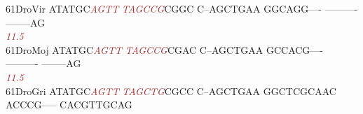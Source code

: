 \documentclass[11pt,twoside,reqno,a4paper]{article}
\begin{document}
{61\hspace*{2\charwidth}DroVir	ATATGC\textit{\textcolor{brown}{A}}\textit{\textcolor{brown}{G}}\textit{\textcolor{brown}{T}}\textit{\textcolor{brown}{T}}	\textit{\textcolor{brown}{T}}\textit{\textcolor{brown}{A}}\textit{\textcolor{brown}{G}}\textit{\textcolor{brown}{C}}\textit{\textcolor{brown}{C}}\textit{\textcolor{brown}{G}}CGGC	C--AGCTGAA	GGCAGG----	----------	--------AG	\\
\hspace*{4\charwidth}\hspace*{7\charwidth}\hspace*{6\charwidth}\textit{\textcolor{brown}{11.5}}\hspace*{1\charwidth}\hspace*{1\charwidth}\hspace*{1\charwidth}\hspace*{1\charwidth}\hspace*{1\charwidth}\hspace*{1\charwidth}\\
61\hspace*{2\charwidth}DroMoj	ATATGC\textit{\textcolor{brown}{A}}\textit{\textcolor{brown}{G}}\textit{\textcolor{brown}{T}}\textit{\textcolor{brown}{T}}	\textit{\textcolor{brown}{T}}\textit{\textcolor{brown}{A}}\textit{\textcolor{brown}{G}}\textit{\textcolor{brown}{C}}\textit{\textcolor{brown}{C}}\textit{\textcolor{brown}{G}}CGAC	C--AGCTGAA	GCCACG----	----------	--------AG	\\
\hspace*{4\charwidth}\hspace*{7\charwidth}\hspace*{6\charwidth}\textit{\textcolor{brown}{11.5}}\hspace*{1\charwidth}\hspace*{1\charwidth}\hspace*{1\charwidth}\hspace*{1\charwidth}\hspace*{1\charwidth}\hspace*{1\charwidth}\\
61\hspace*{2\charwidth}DroGri	ATATGC\textit{\textcolor{brown}{A}}\textit{\textcolor{brown}{G}}\textit{\textcolor{brown}{T}}\textit{\textcolor{brown}{T}}	\textit{\textcolor{brown}{T}}\textit{\textcolor{brown}{A}}\textit{\textcolor{brown}{G}}\textit{\textcolor{brown}{C}}\textit{\textcolor{brown}{T}}\textit{\textcolor{brown}{G}}CGCC	C--AGCTGAA	GGCTCGCAAC	ACCCG-----	CACGTTGCAG	\\
}
\end{document}
